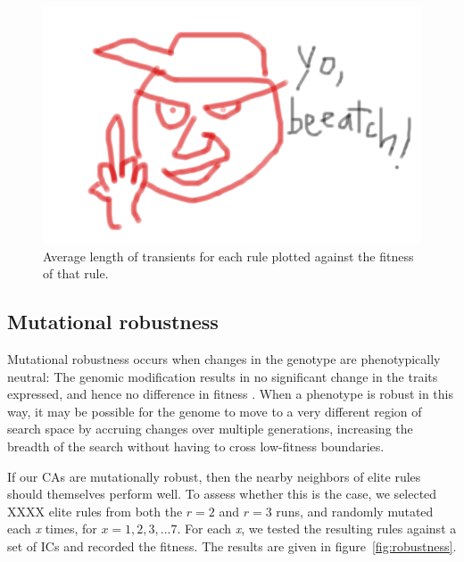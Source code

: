 \begin{figure}
\begin{center}
\includegraphics[width=\linewidth]{foo.png}
\caption{Average length of transients for each rule plotted against the fitness of that rule.}
\label{fig:transients}
\end{center}
\end{figure}

\subsection{Mutational robustness} \label{sec:2_2}

Mutational robustness occurs when changes in the genotype are phenotypically neutral: The genomic modification results in no significant change 
in the traits expressed, and hence no difference in fitness \cite{wagner_role_2012}. When a phenotype is robust in this way, it may be possible for the 
genome to move to a very different region of search space by accruing changes over multiple generations, increasing the breadth of the search without 
having to cross low-fitness boundaries.

If our CAs are mutationally robust, then the nearby neighbors of elite rules should themselves perform well. To assess whether 
this is the case, we selected XXXX elite rules from both the $r = 2$ and $r = 3$ runs, and randomly mutated each \textit{x} times, for $x = 1,2,3, ... 7$. 
For each \textit{x}, we tested the resulting rules against a set of ICs and recorded the fitness. The results are given in figure~\ref{fig:robustness}.

